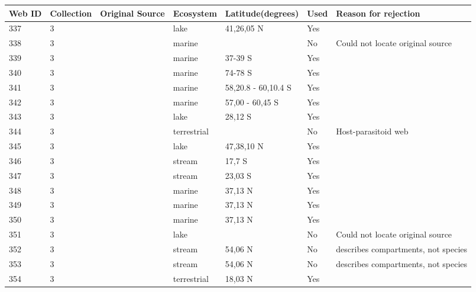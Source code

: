 \documentclass[12pt]{article}
\begin{document}
\begin{landscape}
    \begin{table}[h!]
    \centering
    {\footnotesize
      \begin{tabular}{p{2.8cm}p{1.3cm}p{3cm}p{2.2cm}p{2.5cm}lp{8.2cm}}
        \hline
        Web ID & Collection & Original Source & Ecosystem & Latitude(degrees) & Used  & Reason for rejection  \\
        \hline
        337   & 3 & \cite{Alcorlo2001}  & lake  & 41,26,05 N & Yes   &       \\
        338   & 3 & \cite{Torres2013}  & marine &       & No    & Could not locate original source \\
        339   & 3 & \cite{Bulman2001}  & marine & 37-39 S & Yes   &       \\
        340   & 3 & \cite{Smith2007}  & marine & 74-78 S & Yes   &       \\
        341   & 3 & \cite{Lancraft1991}  & marine & 58,20.8 - 60,10.4 S & Yes   &       \\
        342   & 3 & \cite{Hopkins1993}  & marine & 57,00 - 60,45 S & Yes   &       \\
        343   & 3 & \cite{Kitching1987}  & lake  & 28,12 S & Yes   &       \\
        344   & 3 & \cite{Hodkinson2004}  & terrestrial &       & No    & Host-parasitoid web \\
        345   & 3 & \cite{Boit2012}  & lake  & 47,38,10 N & Yes   &       \\
        346   & 3 & \cite{Rayner2010}  & stream & 17,7 S & Yes   &       \\
        347   & 3 & \cite{Motta2005}  & stream & 23,03 S & Yes   &       \\
        348   & 3 & \cite{Douglass2011}    & marine & 37,13 N & Yes   &       \\
        349   & 3 & \cite{Douglass2011}    & marine & 37,13 N & Yes   &       \\
        350   & 3 & \cite{Douglass2011}    & marine & 37,13 N & Yes   &       \\
        351   & 3 & \cite{Warren1989}     & lake  &       & No    & Could not locate original source \\
        352   & 3 & \cite{Poepperl2003}  & stream & 54,06 N & No    & describes compartments, not species \\
        353   & 3 & \cite{Poepperl2003}  & stream & 54,06 N & No    & describes compartments, not species \\
        354   & 3 & \cite{Goldwasser1993}  & terrestrial & 18,03 N & Yes   &       \\

\end{tabular}}
\end{table}
\end{landscape}
\end{document}
